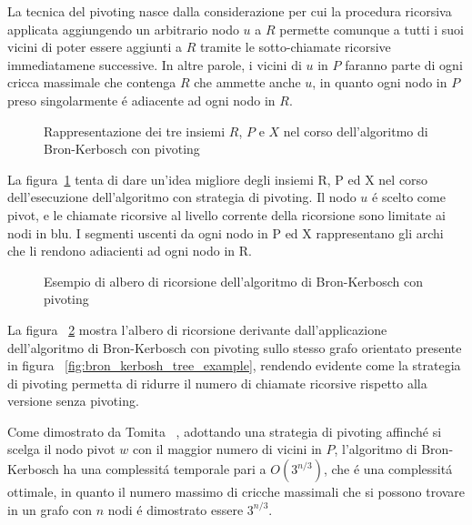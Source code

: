 La tecnica del pivoting nasce dalla considerazione per cui la procedura ricorsiva applicata aggiungendo un arbitrario
nodo $u$ a $R$ permette comunque a tutti i suoi vicini di poter essere aggiunti a $R$ tramite le sotto-chiamate
ricorsive immediatamene successive.
In altre parole, i vicini di $u$ in $P$ faranno parte di ogni cricca massimale che
contenga $R$ che ammette anche $u$, in quanto ogni nodo in $P$ preso singolarmente \'e adiacente ad ogni nodo in $R$.
\newline

\begin{figure}[H]
    \centering
    
    \caption{Rappresentazione dei tre insiemi $R$, $P$ e $X$ nel corso dell'algoritmo di Bron-Kerbosch con pivoting}
    \label{fig:bron_kerbosh_pivot_example}
\end{figure}

La figura~\ref{fig:bron_kerbosh_pivot_example} tenta di dare un'idea migliore degli insiemi R, P ed X nel corso
dell'esecuzione dell'algoritmo con strategia di pivoting.
Il nodo $u$ \'e scelto come pivot, e le chiamate ricorsive al livello corrente della ricorsione sono limitate ai nodi
in blu.
I segmenti uscenti da ogni nodo in P ed X rappresentano gli archi che li rendono adiacienti ad ogni nodo in R.

\begin{figure}[H]
    \centering
    
    \caption{Esempio di albero di ricorsione dell'algoritmo di Bron-Kerbosch con pivoting}
    \label{fig:bron_kerbosh_pivot_tree_example}
\end{figure}

La figura ~\ref{fig:bron_kerbosh_pivot_tree_example} mostra l'albero di ricorsione derivante dall'applicazione
dell'algoritmo di Bron-Kerbosch con pivoting sullo stesso grafo orientato presente in figura
~\ref{fig:bron_kerbosh_tree_example}, rendendo evidente come la strategia di pivoting permetta di ridurre il numero
di chiamate ricorsive rispetto alla versione senza pivoting.


Come dimostrato da Tomita ~\cite{TOMITA200628}, adottando una strategia di pivoting affinch\'e si scelga il nodo pivot
$w$ con il maggior numero di vicini in $P$, l'algoritmo di Bron-Kerbosch ha una complessit\'a temporale pari a
$O(3^{n/3})$, che \'e una complessit\'a ottimale, in quanto il numero massimo di cricche massimali che si possono
trovare in un grafo con $n$ nodi \'e dimostrato essere $3^{n/3}$.

